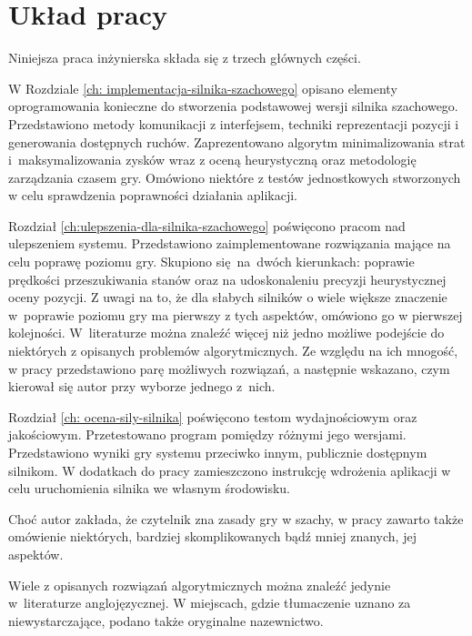 \section{Układ pracy}
\label{sec:uklad-pracy}

Niniejsza praca inżynierska składa się z trzech głównych części.

W Rozdziale \ref{ch: implementacja-silnika-szachowego} opisano elementy oprogramowania konieczne do stworzenia podstawowej wersji silnika szachowego.
Przedstawiono metody komunikacji z interfejsem, techniki reprezentacji pozycji i generowania dostępnych ruchów.
Zaprezentowano algorytm minimalizowania strat i~maksymalizowania zysków wraz z oceną heurystyczną oraz metodologię zarządzania czasem gry.
Omówiono niektóre z testów jednostkowych stworzonych w celu sprawdzenia poprawności działania aplikacji.

Rozdział \ref{ch:ulepszenia-dla-silnika-szachowego} poświęcono pracom nad ulepszeniem systemu.
Przedstawiono zaimplementowane rozwiązania mające na celu poprawę poziomu gry.
Skupiono się~na~dwóch kierunkach: poprawie prędkości przeszukiwania stanów oraz na udoskonaleniu precyzji heurystycznej oceny pozycji.
Z uwagi na to, że dla słabych silników o wiele większe znaczenie w~poprawie poziomu gry ma pierwszy z tych aspektów, omówiono go w pierwszej kolejności\cite*{Vrzina2023}.
W~literaturze można znaleźć więcej niż jedno możliwe podejście do niektórych z opisanych problemów algorytmicznych.
Ze względu na ich mnogość, w pracy przedstawiono parę możliwych rozwiązań, a następnie wskazano, czym kierował się autor przy wyborze jednego z~nich.

Rozdział \ref{ch: ocena-sily-silnika} poświęcono testom wydajnościowym oraz jakościowym.
Przetestowano program pomiędzy różnymi jego wersjami.
Przedstawiono wyniki gry systemu przeciwko innym, publicznie dostępnym silnikom.
W dodatkach do pracy zamieszczono instrukcję wdrożenia aplikacji w celu uruchomienia silnika we własnym środowisku.

Choć autor zakłada, że czytelnik zna zasady gry w szachy, w pracy zawarto także omówienie niektórych, bardziej skomplikowanych bądź mniej znanych, jej aspektów.

Wiele z opisanych rozwiązań algorytmicznych można znaleźć jedynie w~literaturze anglojęzycznej.
W miejscach, gdzie tłumaczenie uznano za niewystarczające, podano także oryginalne nazewnictwo.